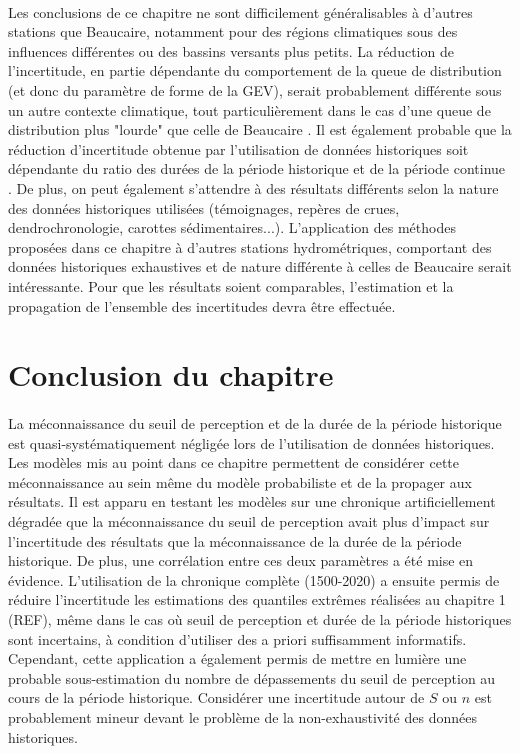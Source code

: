 	\paragraph{} Les conclusions de ce chapitre ne sont difficilement généralisables à d'autres stations que Beaucaire, notamment pour des régions climatiques sous des influences différentes ou des bassins versants plus petits. La réduction de l'incertitude, en partie dépendante du comportement de la queue de distribution (et donc du paramètre de forme de la GEV), serait probablement différente sous un autre contexte climatique, tout particulièrement dans le cas d'une queue de distribution plus "lourde" que celle de Beaucaire \citep{merz_understanding_2022}. Il est également probable que la réduction d'incertitude obtenue par l'utilisation de données historiques soit dépendante du ratio des durées de la période historique et de la période continue \citep{payrastre_usefulness_2011}. De plus, on peut également s'attendre à des résultats différents selon la nature des données historiques utilisées (témoignages, repères de crues, dendrochronologie, carottes sédimentaires...). L'application des méthodes proposées dans ce chapitre à d'autres stations hydrométriques, comportant des données historiques exhaustives et de nature différente à celles de Beaucaire serait intéressante. Pour que les résultats soient comparables, l'estimation et la propagation de l'ensemble des incertitudes devra être effectuée. 
		
	
\section{Conclusion du chapitre}
\label{sec:Conclu}
	\paragraph{} La méconnaissance du seuil de perception et de la durée de la période historique est quasi-systématiquement négligée lors de l'utilisation de données historiques. Les modèles mis au point dans ce chapitre permettent de considérer cette méconnaissance au sein même du modèle probabiliste et de la propager aux résultats. Il est apparu en testant les modèles sur une chronique artificiellement dégradée que la méconnaissance du seuil de perception avait plus d'impact sur l'incertitude des résultats que la méconnaissance de la durée de la période historique. De plus, une corrélation entre ces deux paramètres a été mise en évidence. L'utilisation de la chronique complète (1500-2020) a ensuite permis de réduire l'incertitude les estimations des quantiles extrêmes réalisées au chapitre 1 (REF), même dans le cas où seuil de perception et durée de la période historiques sont incertains, à condition d'utiliser des a priori suffisamment informatifs. Cependant, cette application a également permis de mettre en lumière une probable sous-estimation du nombre de dépassements du seuil de perception au cours de la période historique. Considérer une incertitude autour de $S$ ou $n$ est probablement mineur devant le problème de la non-exhaustivité des données historiques.


